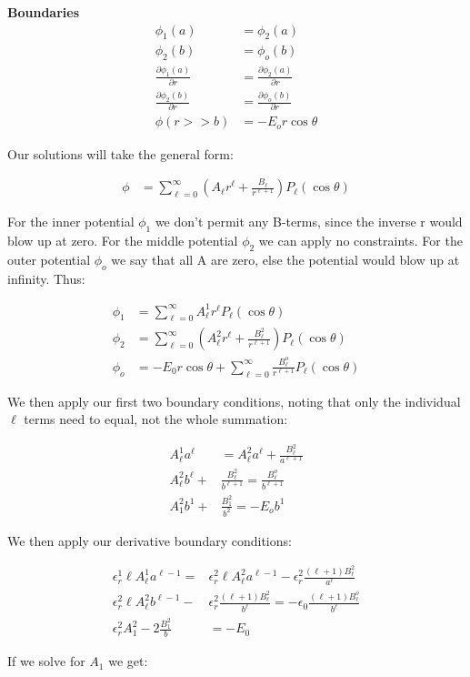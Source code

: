 \documentclass[10pt]{article} %
\begin{document}
\textbf{Boundaries}
\begin{align*}
  \phi_1(a) &= \phi_2(a)\\
  \phi_2(b) &= \phi_o(b)\\
  \frac{\partial \phi_1(a)}{\partial r} &= \frac{\partial \phi_2(a)}{\partial r}\\
  \frac{\partial \phi_2(b)}{\partial r} &= \frac{\partial \phi_o(b)}{\partial r}\\
  \phi(r>>b) &= -E_or\cos\theta
\end{align*}

Our solutions will take the general form:

\begin{align*}
  \phi &= \sum_{\ell = 0}^\infty \left(A_\ell r^\ell + \frac{B_\ell}{r^{\ell+1}}\right)P_\ell(\cos\theta)
\end{align*}

For the inner potential $\phi_1$ we don't permit any B-terms, since the inverse r would blow up at zero. For the middle potential $\phi_2$ we can apply no constraints. For the outer potential $\phi_o$ we say that all A are zero, else the potential would blow up at infinity. Thus:

\begin{align*}
  \phi_1 &= \sum_{\ell = 0}^\infty A^1_\ell r^\ell P_\ell(\cos\theta)\\
  \phi_2 &= \sum_{\ell = 0}^\infty \left(A^2_\ell r^\ell + \frac{B^2_\ell}{r^{\ell+1}}\right)P_\ell(\cos\theta)\\
  \phi_o &= -E_0r\cos\theta + \sum_{\ell = 0}^\infty \frac{B^o_\ell}{r^{\ell+1}}P_\ell(\cos\theta)
\end{align*}

We then apply our first two boundary conditions, noting that only the individual $\ell$ terms need to equal, not the whole summation:

\begin{align*}
  A^1_\ell a^\ell &= A^2_\ell a^\ell + \frac{B^2_\ell}{a^{\ell+1}}\\
  A^2_\ell b^\ell +& \frac{B^2_\ell}{b^{\ell+1}} = \frac{B^o_\ell}{b^{\ell+1}}\\
  A^2_1 b^1 +& \frac{B^2_1}{b^2} = -E_ob^1
\end{align*}

We then apply our derivative boundary conditions:

\begin{align*}
  \epsilon_r^1\ell A^1_\ell a^{\ell-1} =& \epsilon_r^2\ell A^2_\ell a^{\ell-1} - \epsilon_r^2\frac{\left(\ell+1\right)B^2_\ell}{a^\ell}\\
  \epsilon_r^2\ell A^2_\ell b^{\ell-1} -& \epsilon_r^2\frac{\left(\ell+1\right)B^2_\ell}{b^\ell}
  = -\epsilon_0\frac{\left(\ell+1\right)B^o_\ell}{b^\ell}\\
  \epsilon_r^2A^2_1 -2\frac{B_1^2}{b} &= -E_0
\end{align*}

If we solve for $A_1$ we get:
\end{document}
